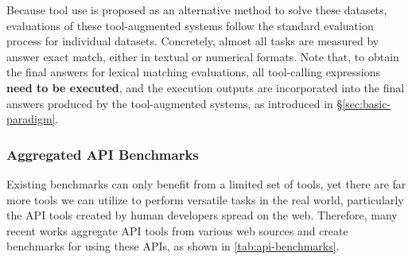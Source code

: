 Because tool use is proposed as an alternative method to solve these datasets, evaluations of these tool-augmented systems follow the standard evaluation process for individual datasets. Concretely, almost all tasks are measured by answer exact match, either in textual or numerical formats.
Note that, to obtain the final answers for lexical matching evaluations, all tool-calling expressions \textbf{need to be executed}, and the execution outputs are incorporated into the final answers produced by the tool-augmented systems, as introduced in \S\ref{sec:basic-paradigm}.

\subsubsection{Aggregated API Benchmarks}
\label{sub:api-benchmark}
Existing benchmarks can only benefit from a limited set of tools, yet there are far more tools we can utilize to perform versatile tasks in the real world, particularly the API tools created by human developers spread on the web. 
Therefore, many recent works aggregate API tools from various web sources and create benchmarks for using these APIs, as shown in \autoref{tab:api-benchmarks}.

